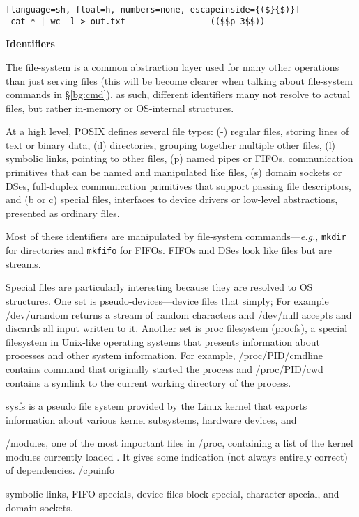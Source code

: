 \documentclass[sigplan,10pt,review,anonymous]{acmart}
\newcommand{\eg}{{\em e.g.}, }
\newcommand{\heading}[1]{\vspace{4pt}\noindent\textbf{#1}\enspace}
\newcommand{\ttt}[1]{\texttt{\small #1}}
\begin{document}
\begin{lstlisting}[language=sh, float=h, numbers=none, escapeinside={($}{$)}]
 cat * | wc -l > out.txt                 (($$p_3$$))
\end{lstlisting}

\heading{Identifiers}

The file-system is a common abstraction layer used for many other operations than just serving files (this will be become clearer when talking about file-system commands in \S\ref{bg:cmd}).
as such, different identifiers many not resolve to actual files, but rather in-memory or OS-internal structures.

At a high level, POSIX defines several file types:
(-) regular files, storing lines of text or binary data,
(d) directories, grouping together multiple other files,
(l) symbolic links, pointing to other files,
(p) named pipes or FIFOs, communication primitives that can be named and manipulated like files,
(s) domain sockets or DSes, full-duplex communication primitives that support passing file descriptors, and
(b or c) special files, interfaces to device drivers or low-level abstractions, presented as ordinary files.

Most of these identifiers are manipulated by file-system commands---\eg \ttt{mkdir} for directories and \ttt{mkfifo} for FIFOs.
FIFOs and DSes look like files but are streams.

Special files are particularly interesting because they are resolved to OS structures.
One set is pseudo-devices---device files that simply;
For example /dev/urandom returns a stream of random characters and /dev/null accepts and discards all input written to it.
Another set is proc filesystem (procfs), a special filesystem in Unix-like operating systems that presents information about processes and other system information.
For example, /proc/PID/cmdline contains command that originally started the process and /proc/PID/cwd contains a symlink to the current working directory of the process.

sysfs is a pseudo file system provided by the Linux kernel that exports information about various kernel subsystems, hardware devices, and 

/modules, one of the most important files in /proc, containing a list of the kernel modules currently loaded . It gives some indication (not always entirely correct) of dependencies.
/cpuinfo

symbolic links, FIFO specials, 
device files
block special, character special, 
and domain sockets.
\end{document}
